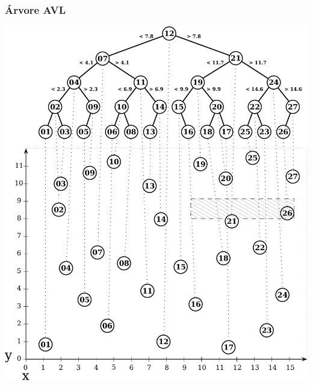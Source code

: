 \documentclass[10pt,xcolor=table,fleqn]{beamer}
\begin{document}
\begin{frame}
  \frametitle{Árvore AVL}
  \begin{center}
    \includegraphics[scale=0.3]{../img/points-query/avl/points-avl-model}
  \end{center}
\end{frame}
\end{document}
